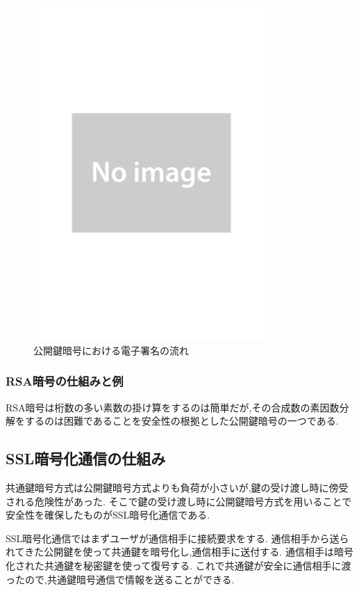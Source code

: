 \documentclass[a4j,12pt]{jsarticle}
\begin{document}
\begin{figure}[H]
\centering
\includegraphics[width=9cm]{noimage.pdf}
\caption{公開鍵暗号における電子署名の流れ}
\label{fig:no}
\end{figure} 




\subsubsection{RSA暗号の仕組みと例}
RSA暗号は桁数の多い素数の掛け算をするのは簡単だが,その合成数の素因数分解をするのは困難であることを安全性の根拠とした公開鍵暗号の一つである.



\subsection{SSL暗号化通信の仕組み}
共通鍵暗号方式は公開鍵暗号方式よりも負荷が小さいが,鍵の受け渡し時に傍受される危険性があった.
そこで鍵の受け渡し時に公開鍵暗号方式を用いることで安全性を確保したものがSSL暗号化通信である.

SSL暗号化通信ではまずユーザが通信相手に接続要求をする.
通信相手から送られてきた公開鍵を使って共通鍵を暗号化し,通信相手に送付する.
通信相手は暗号化された共通鍵を秘密鍵を使って復号する.
これで共通鍵が安全に通信相手に渡ったので,共通鍵暗号通信で情報を送ることができる.
\end{document}
